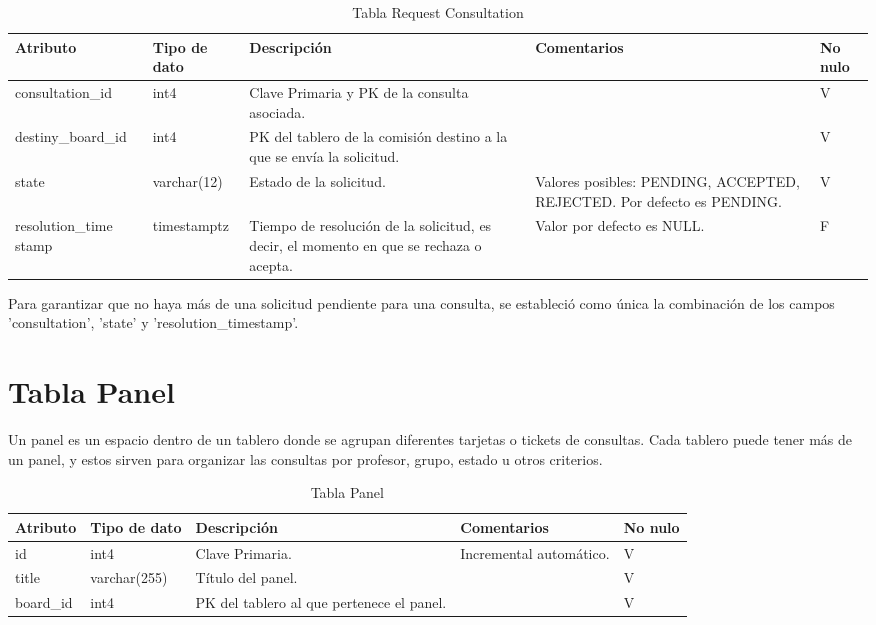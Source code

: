 \begin{table}[H]
\centering
\label{tab:req-consult}
\begin{tabular}{|p{3cm}|p{2.5cm}|p{4.5cm}|p{4cm}|p{1cm}|}
\hline
\textbf{Atributo} & \textbf{Tipo de dato}  & \textbf{Descripción} & \textbf{Comentarios} & \textbf{No nulo} \\ \hline
consultation\_id & int4 & Clave Primaria y PK de la consulta asociada. & & V \\ \hline
destiny\_board\_id & int4 &  PK del tablero de la comisión destino a la que se envía la solicitud. &  & V \\ \hline
state & varchar(12) & Estado de la solicitud. & Valores posibles: PENDING, ACCEPTED, REJECTED. Por defecto es PENDING. & V \\ \hline
resolution\_time stamp & timestamptz & Tiempo de resolución de la solicitud, es decir, el momento en que se rechaza o acepta. & Valor por defecto es NULL. & F \\ \hline
\end{tabular}
\caption{Tabla Request Consultation}
\end{table}

Para garantizar que no haya más de una solicitud pendiente para una consulta, se estableció como única la combinación de los campos 'consultation', 'state' y 'resolution\_timestamp'.


\section{Tabla Panel}\label{sec:table-panel}
Un panel es un espacio dentro de un tablero donde se agrupan diferentes tarjetas o tickets de consultas. Cada tablero puede tener más de un panel, y estos sirven para organizar las consultas por profesor, grupo, estado u otros criterios.

\begin{table}[H]
\centering
\label{tab:panel}
\begin{tabular}{|p{3cm}|p{2.5cm}|p{4.5cm}|p{4cm}|p{1cm}|}
\hline
\textbf{Atributo} & \textbf{Tipo de dato}  & \textbf{Descripción} & \textbf{Comentarios} & \textbf{No nulo} \\ \hline
id & int4 & Clave Primaria. & Incremental automático. & V \\ \hline
title & varchar(255) &  Título del panel. &  & V \\ \hline
board\_id & int4 & PK del tablero al que pertenece el panel. &  & V \\ \hline
\end{tabular}
\caption{Tabla Panel}
\end{table}